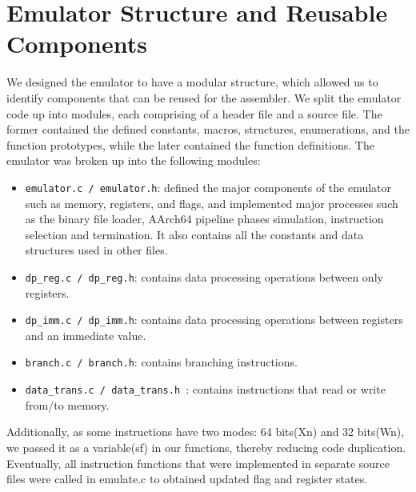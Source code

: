 \documentclass{article}
\begin{document}
    \section{Emulator Structure and Reusable Components}
    We designed the emulator to have a modular structure, which allowed us to identify components that can be reused for the assembler. We split the emulator code up into modules, each comprising of a header file and a source file. The former contained the defined constants, macros, structures, enumerations, and the function prototypes, while the later contained the function definitions. The emulator was broken up into the following modules:
    \begin{itemize}
        \item \texttt{emulator.c / emulator.h}: defined the major components of the emulator such as memory, registers, and flags, and implemented major processes such as the binary file loader, AArch64 pipeline phases simulation, instruction selection and termination. It also contains all the constants and data structures used in other files. 
        \item  \texttt{dp\_reg.c / dp\_reg.h}: contains data processing operations between only registers.
        \item \texttt{dp\_imm.c / dp\_imm.h}: contains data processing operations between registers and an immediate value.
        \item \texttt{branch.c / branch.h}: contains branching instructions.
        \item \texttt{data\_trans.c / data\_trans.h }: contains instructions that read or write from/to memory.
    \end{itemize}
    
    Additionally, as some instructions have two modes: 64 bits(Xn) and 32 bits(Wn), we passed it as a variable(sf) in our functions, thereby reducing code duplication. Eventually, all instruction functions that were implemented in separate source files were called in emulate.c to obtained updated flag and register states.
    
\end{document}
